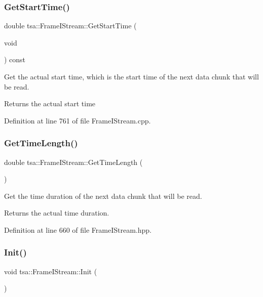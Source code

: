 \subsubsection{\texorpdfstring{Get\+Start\+Time()}{GetStartTime()}}
{\footnotesize\ttfamily double tsa\+::\+Frame\+I\+Stream\+::\+Get\+Start\+Time (\begin{DoxyParamCaption}\item[{void}]{ }\end{DoxyParamCaption}) const}

Get the actual start time, which is the start time of the next data chunk that will be read.

\begin{DoxyReturn}{Returns}
the actual start time 
\end{DoxyReturn}


Definition at line 761 of file Frame\+I\+Stream.\+cpp.

\mbox{\label{classtsa_1_1_frame_i_stream_aa9cae02ea01e99c39ba6a9da12fa8a21}} 
\subsubsection{\texorpdfstring{Get\+Time\+Length()}{GetTimeLength()}}
{\footnotesize\ttfamily double tsa\+::\+Frame\+I\+Stream\+::\+Get\+Time\+Length (\begin{DoxyParamCaption}{ }\end{DoxyParamCaption})\hspace{0.3cm}{\ttfamily [inline]}}

Get the time duration of the next data chunk that will be read.

\begin{DoxyReturn}{Returns}
the actual time duration. 
\end{DoxyReturn}


Definition at line 660 of file Frame\+I\+Stream.\+hpp.

\mbox{\label{classtsa_1_1_frame_i_stream_a9c53d0d13f4fe78ce0eef01af69e3f22}} 
\subsubsection{\texorpdfstring{Init()}{Init()}}
{\footnotesize\ttfamily void tsa\+::\+Frame\+I\+Stream\+::\+Init (\begin{DoxyParamCaption}{ }\end{DoxyParamCaption})}



